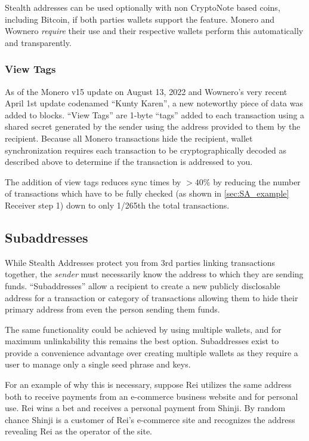 Stealth addresses can be used optionally with non CryptoNote based coins, including Bitcoin, if both parties wallets support the feature\cite{stack_stealth}. Monero and Wownero \emph{require} their use and their respective wallets perform this automatically and transparently\cite{moneropedia}.

\subsubsection{View Tags}
As of the Monero v15 update on August 13, 2022\cite{monero_repo} and Wownero's very recent April 1st update codenamed ``Kunty Karen''\cite{wowrepo}, a new noteworthy piece of data was added to blocks. ``View Tags'' are 1-byte ``tags'' added to each transaction using a shared secret generated by the sender using the address provided to them by the recipient\cite{monero_viewtag}. Because all Monero transactions hide the recipient, wallet synchronization requires each transaction to be cryptographically decoded as described above to determine if the transaction is addressed to you.

The addition of view tags reduces sync times by $> 40\%$ by reducing the number of transactions which have to be fully checked (as shown in \ref{sec:SA_example} Receiver step 1) down to only 1/265th the total transactions\cite{monero_viewtag}.


\subsection{Subaddresses}
While Stealth Addresses protect you from 3rd parties linking transactions together, the \emph{sender} must necessarily know the address to which they are sending funds. ``Subaddresses'' allow a recipient to create a new publicly disclosable address for a transaction or category of transactions\cite{monerodoc_subaddr} allowing them to hide their primary address from even the person sending them funds\cite{moneropedia}.

The same functionality could be achieved by using multiple wallets, and for maximum unlinkability this remains the best option. Subaddresses exist to provide a convenience advantage over creating multiple wallets as they require a user to manage only a single seed phrase and keys\cite{monerodoc_subaddr}.

For an example of why this is necessary, suppose Rei utilizes the same address both to receive payments from an e-commerce business website and for personal use. Rei wins a bet and receives a personal payment from Shinji. By random chance Shinji is a customer of Rei's e-commerce site and recognizes the address revealing Rei as the operator of the site.

